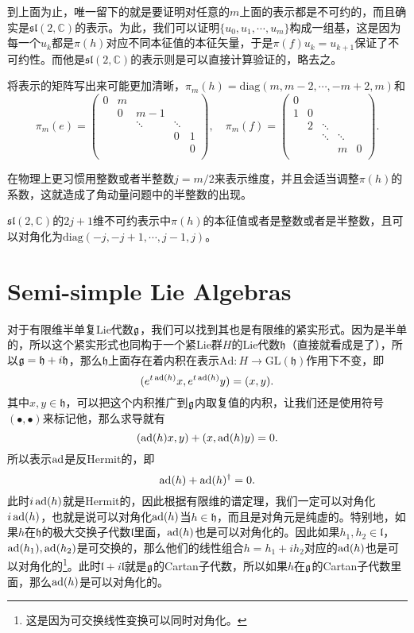 到上面为止，唯一留下的就是要证明对任意的$m$上面的表示都是不可约的，而且确实是$\mathfrak{sl}(2,\mathbb{C})$的表示。为此，我们可以证明$\{u_0,u_1,\cdots,u_m\}$构成一组基，这是因为每一个$u_k$都是$\pi(h)$对应不同本征值的本征矢量，于是$\pi(f)u_k=u_{k+1}$保证了不可约性。而他是$\mathfrak{sl}(2,\mathbb{C})$的表示则是可以直接计算验证的，略去之。

将表示的矩阵写出来可能更加清晰，$\pi_m(h)=\mathrm{diag}(m,m-2,\cdots,-m+2,m)$和
\[
\pi_m(e)=\begin{pmatrix}
	0&m&&&\\
	&0&m-1&&\\
	&&\ddots&\ddots&\\
	&&&0&1\\
	&&&&0\\
\end{pmatrix},\quad
\pi_m(f)=\begin{pmatrix}
	0&&&&\\
	1&0&&&\\
	&2&\ddots&&\\
	&&\ddots&\ddots&\\
	&&&m&0\\
\end{pmatrix}.
\]

在物理上更习惯用整数或者半整数$j=m/2$来表示维度，并且会适当调整$\pi(h)$的系数，这就造成了角动量问题中的半整数的出现。

\pro $\mathfrak{sl}(2,\mathbb{C})$的$2j+1$维不可约表示中$\pi(h)$的本征值或者是整数或者是半整数，且可以对角化为$\mathrm{diag}(-j,-j+1,\cdots,j-1,j)$。

\section{Semi-simple Lie Algebras}

对于有限维半单复Lie代数${\mathfrak{g}}$，我们可以找到其也是有限维的紧实形式。因为是半单的，所以这个紧实形式也同构于一个紧Lie群$H$的Lie代数$\mathfrak{h}$（直接就看成是了），所以${\mathfrak{g}}=\mathfrak{h}+i\mathfrak{h}$，那么$\mathfrak{h}$上面存在着内积在表示$\mathrm{Ad}:H\to \mathrm{GL}(\mathfrak{h})$作用下不变，即
\[
	(e^{t\operatorname{ad}(h)}x,e^{t\operatorname{ad}(h)}y)=(x,y).
\]
其中$x,y\in\mathfrak{h}$，可以把这个内积推广到${\mathfrak{g}}$内取复值的内积，让我们还是使用符号$(\bullet,\bullet)$来标记他，那么求导就有
\[
	(\operatorname{ad}(h)x,y)+(x,\operatorname{ad}(h)y)=0.
\]
所以表示$\operatorname{ad}$是反Hermit的，即
\[
	\operatorname{ad}(h)+\operatorname{ad}(h)^\dag=0.
\]
此时$i\operatorname{ad}(h)$就是Hermit的，因此根据有限维的谱定理，我们一定可以对角化$i\operatorname{ad}(h)$，也就是说可以对角化$\operatorname{ad}(h)$当$h\in \mathfrak{h}$，而且是对角元是纯虚的。特别地，如果$h$在$\mathfrak{h}$的极大交换子代数$\mathfrak{l}$里面，$\operatorname{ad}(h)$也是可以对角化的。因此如果$h_1,h_2\in\mathfrak{l}$，$\operatorname{ad}(h_1),\operatorname{ad}(h_2)$是可交换的，那么他们的线性组合$h=h_1+ih_2$对应的$\operatorname{ad}(h)$也是可以对角化的\footnote{这是因为可交换线性变换可以同时对角化。}。此时$\mathfrak{l}+i\mathfrak{l}$就是${\mathfrak{g}}$的Cartan子代数，所以如果$h$在${\mathfrak{g}}$的Cartan子代数里面，那么$\operatorname{ad}(h)$是可以对角化的。

